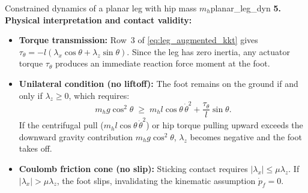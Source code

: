 \documentclass[11pt,a4paper]{article}
\begin{document}
\begin{example}{Constrained dynamics of a planar leg with hip mass $m_h$}{planar_leg_dyn}
\textbf{5. Physical interpretation and contact validity:}\\
\begin{itemize}[nosep]
  \item \textbf{Torque transmission:} Row~3 of \eqref{eq:leg_augmented_kkt} gives $\tau_\theta = -l(\lambda_x\cos\theta + \lambda_z\sin\theta)$. Since the leg has zero inertia, any actuator torque $\tau_\theta$ produces an immediate reaction force moment at the foot.
  \item \textbf{Unilateral condition (no liftoff):} The foot remains on the ground if and only if $\lambda_z \ge 0$, which requires:
  \begin{equation}
    m_h g\cos^2\theta \;\ge\; m_h l\cos\theta\,\dot\theta^2 + \frac{\tau_\theta}{l}\sin\theta.
  \end{equation}
  If the centrifugal pull ($m_h l\cos\theta\,\dot\theta^2$) or hip torque pulling upward exceeds the downward gravity contribution $m_h g\cos^2\theta$, $\lambda_z$ becomes negative and the foot takes off.
  \item \textbf{Coulomb friction cone (no slip):} Sticking contact requires $|\lambda_x| \le \mu \lambda_z$. If $|\lambda_x| > \mu \lambda_z$, the foot slips, invalidating the kinematic assumption $\dot p_f = 0$.
\end{itemize}

\begin{center}
\end{center}
\end{example}
\end{document}
